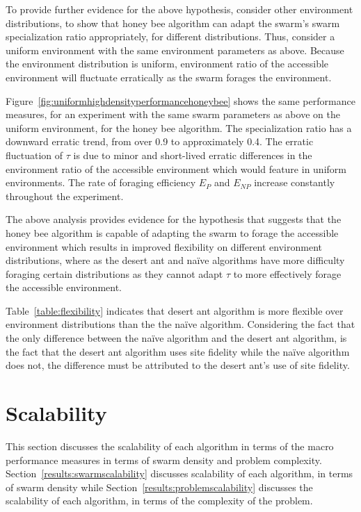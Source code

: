 To provide further evidence for the above hypothesis, consider other environment distributions, to show that honey bee algorithm can adapt the swarm's swarm specialization ratio appropriately, for different distributions. Thus, consider a uniform environment with the same environment parameters as above. Because the environment distribution is uniform, environment ratio of the accessible environment will fluctuate erratically as the swarm forages the environment.  

Figure~\ref{fig:uniformhighdensityperformancehoneybee} shows the same performance measures, for an experiment with the same swarm parameters as above on the uniform environment, for the honey bee algorithm. The specialization ratio has a downward erratic trend, from over 0.9 to approximately 0.4. The erratic fluctuation of $\tau$ is due to minor and short-lived erratic differences in the environment ratio of the accessible environment which would feature in uniform environments. The rate of foraging efficiency $E_P$ and $E_{NP}$  increase constantly throughout the experiment. 

The above analysis provides evidence for the hypothesis that suggests that the honey bee algorithm is capable of adapting the swarm to forage the accessible environment which results in improved flexibility on different environment distributions, where as the desert ant and na\"ive algorithms have more difficulty foraging certain distributions as they cannot adapt $\tau$ to more effectively forage the accessible environment.

Table~\ref{table:flexibility} indicates that desert ant algorithm is more flexible over environment distributions than the the na\"ive algorithm. Considering the fact that the only difference between the na\"ive algorithm and the desert ant algorithm, is the fact that the desert ant algorithm uses site fidelity while the na\"ive algorithm does not, the difference must be attributed to the desert ant's use of site fidelity. %

\section{Scalability}
\label{results:scalability}

This section discusses the scalability of each algorithm in terms of the macro performance measures in terms of swarm density and problem complexity. Section~\ref{results:swarmscalability} discusses scalability of each algorithm, in terms of swarm density while Section~\ref{results:problemscalability} discusses the scalability of each algorithm, in terms of the complexity of the problem.

